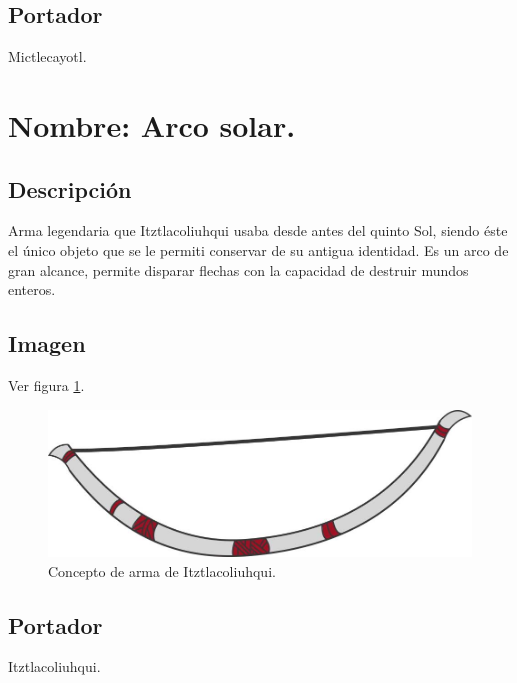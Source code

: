\subsection{Portador}
Mictlecayotl.
\section{Nombre: Arco solar.}\label{Arma:ArcoItztla}
\subsection{Descripción}
Arma legendaria que Itztlacoliuhqui usaba desde antes del quinto Sol, siendo éste el único objeto que se le permiti conservar de su antigua identidad. Es un arco de gran alcance, permite disparar flechas con la capacidad de destruir mundos enteros. 
\subsection{Imagen}
			Ver figura \ref{fig:ArcoSolar}.
		\begin{figure}
			\centering
			\includegraphics[height=0.1 \textheight]{Imagenes/arco}
			\caption{Concepto de arma de Itztlacoliuhqui.}
			\label{fig:ArcoSolar}
		\end{figure}
\subsection{Portador}
Itztlacoliuhqui.